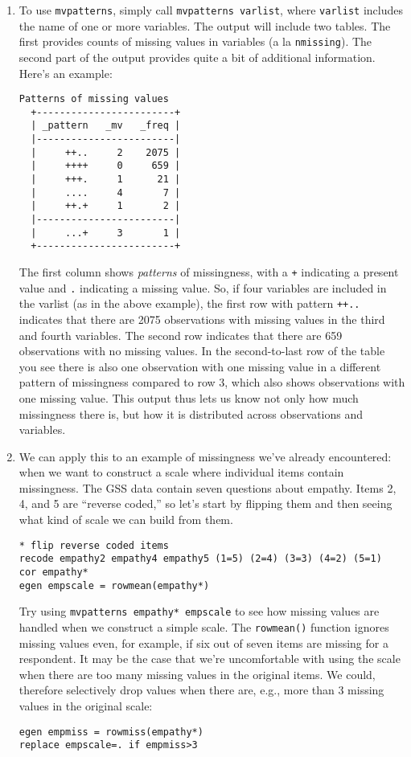 \documentclass[a4paper,12pt]{article}
\begin{document}
\begin{enumerate}
\item To use \texttt{mvpatterns}, simply call \texttt{mvpatterns varlist}, where \texttt{varlist} includes the name of one or more variables. The output will include two tables. The first provides counts of missing values in variables (a la \texttt{nmissing}). The second part of the output provides quite a bit of additional information. Here's an example:

\begin{verbatim}
Patterns of missing values
  +------------------------+
  | _pattern   _mv   _freq |
  |------------------------|
  |     ++..     2    2075 |
  |     ++++     0     659 |
  |     +++.     1      21 |
  |     ....     4       7 |
  |     ++.+     1       2 |
  |------------------------|
  |     ...+     3       1 |
  +------------------------+
\end{verbatim}

The first column shows {\em patterns} of missingness, with a \texttt{+} indicating a present value and \texttt{.} indicating a missing value. So, if four variables are included in the varlist (as in the above example), the first row with pattern \texttt{++..} indicates that there are 2075 observations with missing values in the third and fourth variables. The second row indicates that there are 659 observations with no missing values. In the second-to-last row of the table you see there is also one observation with one missing value in a different pattern of missingness compared to row 3, which also shows observations with one missing value. This output thus lets us know not only how much missingness there is, but how it is distributed across observations and variables.

\item We can apply this to an example of missingness we've already encountered: when we want to construct a scale where individual items contain missingness. The GSS data contain seven questions about empathy. Items 2, 4, and 5 are ``reverse coded,'' so let's start by flipping them and then seeing what kind of scale we can build from them.
\begin{verbatim}
* flip reverse coded items
recode empathy2 empathy4 empathy5 (1=5) (2=4) (3=3) (4=2) (5=1)
cor empathy*
egen empscale = rowmean(empathy*)
\end{verbatim}

Try using \texttt{mvpatterns empathy* empscale} to see how missing values are handled when we construct a simple scale. The \texttt{rowmean()} function ignores missing values even, for example, if six out of seven items are missing for a respondent. It may be the case that we're uncomfortable with using the scale when there are too many missing values in the original items. We could, therefore selectively drop values when there are, e.g., more than 3 missing values in the original scale:
\begin{verbatim}
egen empmiss = rowmiss(empathy*)
replace empscale=. if empmiss>3
\end{verbatim}



\end{enumerate}
\end{document}
